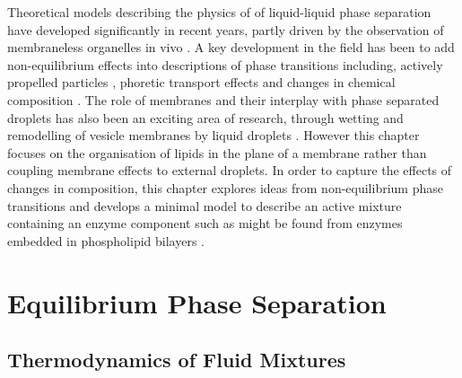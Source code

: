 Theoretical models describing the physics of of liquid-liquid phase separation have developed significantly in recent years, partly driven by the observation of membraneless organelles in vivo \cite{shin_liquid_2017}. A key development in the field has been to add non-equilibrium effects into descriptions of phase transitions including, actively propelled particles \cite{cates_motility-induced_2015}, phoretic transport effects \cite{agudo-canalejo_active_2019} and changes in chemical composition \cite{weber_drops_2021, li_non-equilibrium_2020}. The role of membranes and their interplay with phase separated droplets has also been an exciting area of research, through wetting and remodelling of vesicle membranes by liquid droplets \cite{mangiarotti_wetting_2023}. However this chapter focuses on the organisation of lipids in the plane of a membrane rather than coupling membrane effects to external droplets. In order to capture the effects of changes in composition, this chapter explores ideas from non-equilibrium phase transitions and develops a minimal model to describe an active mixture containing an enzyme component such as might be found from enzymes embedded in phospholipid bilayers \cite{alberts_molecular_2008}.

\section{Equilibrium Phase Separation}

\subsection{Thermodynamics of Fluid Mixtures}

